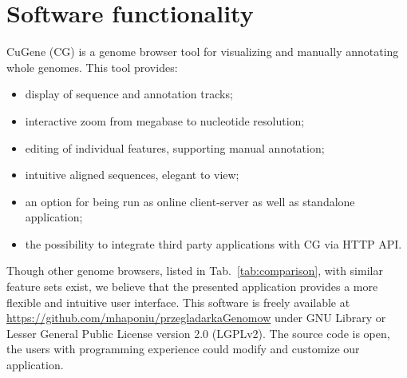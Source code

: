 \documentclass[a4paper]{spie}
\newcommand{\appName}{CuGene}
\newcommand{\appShortcut}{CG}
\begin{document}
\section{Software functionality}

\appName{} (\appShortcut) is a genome browser tool for visualizing and manually annotating whole genomes.
This tool provides:
\begin{itemize}
\itemsep0em
\item display of sequence and annotation tracks;
\item interactive zoom from megabase to nucleotide resolution;
\item editing of individual features, supporting manual annotation;
\item intuitive aligned sequences, elegant to view;
\item an option for being run as online client-server as well as standalone application;
\item the possibility to integrate third party applications with \appShortcut{} via HTTP API.
\end{itemize}

Though other genome browsers, listed in Tab.~\ref{tab:comparison}, with similar feature sets exist,
we believe that the presented application provides a more flexible and intuitive user interface.
This software is freely available at \url{https://github.com/mhaponiu/przegladarkaGenomow} under GNU Library or Lesser General Public License version 2.0 (LGPLv2).
The source code is open, the users with programming experience could modify and customize our application.
\end{document}
